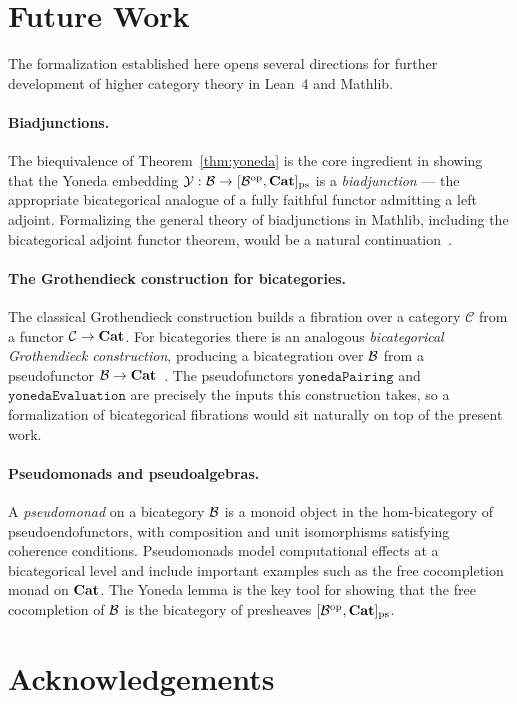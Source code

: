 \documentclass[12pt]{article}
\begin{document}
\section{Future Work}\label{sec:open}

The formalization established here opens several directions for further development
of higher category theory in Lean~4 and Mathlib.

\paragraph{Biadjunctions.}
The biequivalence of Theorem~\ref{thm:yoneda} is the core ingredient in showing that
the Yoneda embedding $\mathcal{Y} : \mathcal{B} \to [\mathcal{B}^{\mathrm{op}}, \mathbf{Cat}]_{\mathrm{ps}}$ is a
\emph{biadjunction} --- the appropriate bicategorical analogue of a fully faithful
functor admitting a left adjoint.  Formalizing the general theory of biadjunctions
in Mathlib, including the bicategorical adjoint functor theorem, would be a natural
continuation~\citep{lack2010}.

\paragraph{The Grothendieck construction for bicategories.}
The classical Grothendieck construction builds a fibration over a category $\mathcal{C}$
from a functor $\mathcal{C} \to \mathbf{Cat}$.  For bicategories there is an analogous
\emph{bicategorical Grothendieck construction}, producing a bicategration over $\mathcal{B}$ from
a pseudofunctor $\mathcal{B} \to \mathbf{Cat}$~\citep{street1974}.  The pseudofunctors
$\mathtt{yonedaPairing}$ and $\mathtt{yonedaEvaluation}$ are precisely the inputs this
construction takes, so a formalization of bicategorical fibrations would sit naturally on
top of the present work.

\paragraph{Pseudomonads and pseudoalgebras.}
A \emph{pseudomonad} on a bicategory $\mathcal{B}$ is a monoid object in the hom-bicategory of
pseudoendofunctors, with composition and unit isomorphisms satisfying coherence
conditions.  Pseudomonads model computational effects at a bicategorical level and
include important examples such as the free cocompletion monad on $\mathbf{Cat}$.  The Yoneda
lemma is the key tool for showing that the free cocompletion of $\mathcal{B}$ is the bicategory
of presheaves $[\mathcal{B}^{\mathrm{op}}, \mathbf{Cat}]_{\mathrm{ps}}$.

\section*{Acknowledgements}




\end{document}
